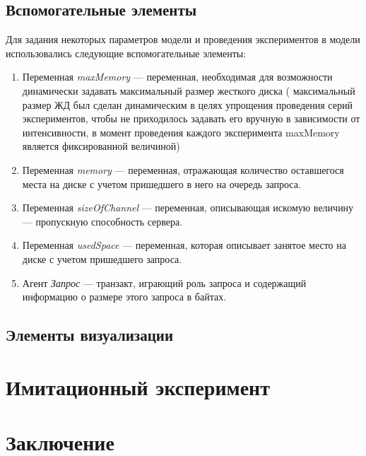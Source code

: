 \subsection{Вспомогательные элементы}
Для задания некоторых параметров модели и проведения экспериментов в модели использовались следующие вспомогательные элементы:
\begin{enumerate}
    \item Переменная \textit{maxMemory} --- переменная, необходимая для возможности динамически задавать максимальный размер жесткого диска (
    максимальный размер ЖД был сделан динамическим в целях упрощения проведения серий экспериментов, чтобы не приходилось задавать его вручную
    в зависимости от интенсивности, в момент проведения каждого эксперимента maxMemory является фиксированной величиной)
    \item Переменная \textit{memory} --- переменная, отражающая количество оставшегося места на диске с учетом пришедшего в него на очередь запроса.
    \item Переменная \textit{sizeOfChannel} --- переменная, описывающая искомую величину --- пропускную способность сервера.
    \item Переменная \textit{usedSpace} --- переменная, которая описывает занятое место на диске с учетом пришедшего запроса.
    \item Агент \textit{Запрос} --- транзакт, играющий роль запроса и содержащий информацию о размере этого запроса в байтах.
\end{enumerate}

\subsection{Элементы визуализации}

\newpage
\section{Имитационный эксперимент}

\newpage
\section{Заключение}



